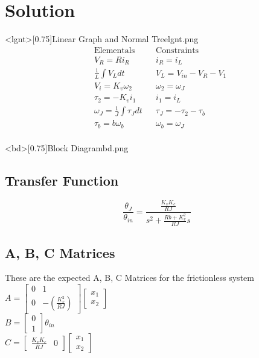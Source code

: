 \documentclass{homework}
\begin{document}
\section*{Solution}
\img<lgnt>[0.75]{Linear Graph and Normal Tree}{lgnt.png}
\begin{align*}
	& \text{Elementals} &  & \text{Constraints}	\\
	& V_R = Ri_R         &  & i_R = i_L        \\
	& \frac{1}{L}\int{}V_Ldt         &  & V_L = V_{in} - V_R - V_1        \\
	& V_i  = K_v\omega_2       &  & \omega_2 = \omega_J        \\
	& \tau_2 = -K_vi_1         &  & i_1 = i_L        \\
	& \omega_J = \frac{1}{J}\int{}\tau_Jdt         &  & \tau_J = -\tau_2 - \tau_b        \\
	& \tau_b = b\omega_b         &  & \omega_b = \omega_J        \\
\end{align*}

\img<bd>[0.75]{Block Diagram}{bd.png}
\newpage
\subsection*{Transfer Function}

\[\frac{\theta_J}{\theta_{in}} = \frac{\frac{K_vK_c}{RJ}}{s^2 + \frac{Rb + K_v^2}{RJ}s}\]

\subsection*{A, B, C Matrices}

These are the expected A, B, C Matrices for the frictionless system
\[\]
$A = \begin{bmatrix}
0 & 1\\
0 & -(\frac{K_v^2}{RJ})
\end{bmatrix}\begin{bmatrix}
x_1\\
x_2
\end{bmatrix}$
\[\]
$B = \begin{bmatrix}
0\\
1
\end{bmatrix}\theta_{in}$
\[\]
$C = \begin{bmatrix}
\frac{K_vK_c}{RJ} & 0
\end{bmatrix}\begin{bmatrix}
x_1\\
x_2\end{bmatrix}$
\end{document}
